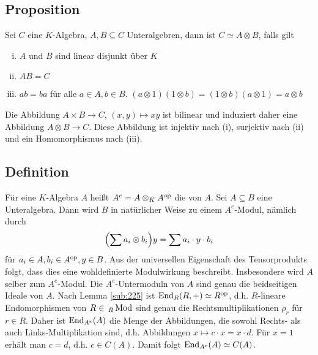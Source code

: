 \subsection[Proposition: Isomorphie einer $K$-Algebra zum Tensorprodukt von Unteralgebren]{Proposition} %
\label{sub:317}
Sei $C$ eine $K$-Algebra, $A,B \subseteq C$ Unteralgebren, dann ist $C \simeq A \otimes B$, falls gilt
\begin{enumerate}[(i)]
	\item $A$ und $B$ sind linear disjunkt über $K$
	\item $A B = C$
	\item $a b = b a$ für alle $a \in A, b \in B$. {\small \color{light_gray} $(a \otimes 1)(1 \otimes b)= (1 \otimes b)(a	\otimes 1)= a \otimes b$}
\end{enumerate}
Die Abbildung $A \times B \to C$, $(x,y) \mapsto xy$ ist bilinear und induziert daher eine Abbildung $A \otimes B \to C$. Diese Abbildung ist injektiv nach (i), surjektiv
nach (ii) und ein Homomorphismus nach (iii). \bewende

\subsection[Definition: Einhüllende Algebra]{Definition} %
\label{sub:318}
Für eine $K$-Algebra $A$ heißt $A^e = A \otimes_K A^{\mathrm{op}}$ die  von $A$. Sei $A \subseteq B$ eine Unteralgebra. Dann wird $B$ in 
natürlicher Weise zu einem $A^e$-Modul, nämlich durch 
\[
	\enbrace*{\sum a_i \otimes b_i} y = \sum a_i \cdot y \cdot b_i
\]
für $a_i \in A, b_i \in A^{\mathrm{op}}, y \in B$. Aus der universellen Eigenschaft des Tensorprodukts folgt, dass dies eine wohldefinierte Modulwirkung beschreibt. 
Insbesondere wird $A$ selber zum $A^e$-Modul. Die $A^e$-Untermoduln von $A$ sind genau die beidseitigen Ideale von $A$. Nach Lemma \ref{sub:225} ist 
$\operatorname{End}_R(R,+) \simeq R^{\mathrm{op}}$, d.h. $R$-lineare Endomorphismen von $R \in \,{_R\operatorname{Mod}}$ sind genau die Rechtsmultiplikationen $\rho_r$ für $r \in R$. Daher ist 
$\operatorname{End}_{A^e}(A)$ die Menge der Abbildungen, die sowohl Rechts- als auch Links-Multiplikation sind, d.h. Abbildungen $x \mapsto c \cdot x = x \cdot d$. Für $x=1$ erhält
man $c=d$, d.h. $c \in C(A)$. Damit folgt $\operatorname{End}_{A^e}(A) \simeq C(A)$.

